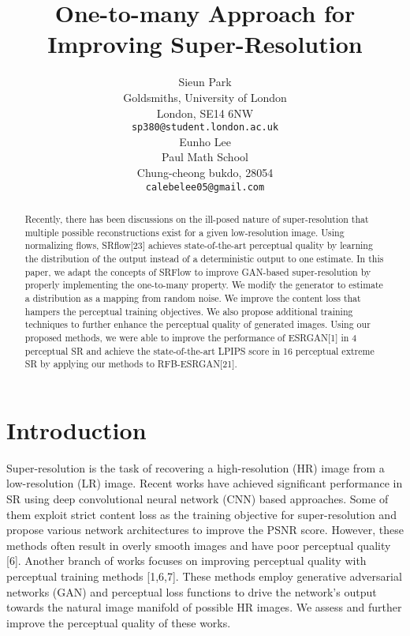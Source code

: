 \documentclass{article}
\title{One-to-many Approach for Improving Super-Resolution}
\author{Sieun Park \\
  Goldsmiths, University of London\\
  London, SE14 6NW \\
  \texttt{sp380@student.london.ac.uk} \\
\And
   Eunho Lee \\
   Paul Math School \\
   Chung-cheong bukdo, 28054 \\
   \texttt{calebelee05@gmail.com} \\
}
\begin{document}
\maketitle

\begin{abstract}


  Recently, there has been discussions on the ill-posed nature of super-resolution that multiple possible reconstructions exist for a given low-resolution image. Using normalizing flows, SRflow[23] achieves state-of-the-art perceptual quality by learning the distribution of the output instead of a deterministic output to one estimate. In this paper, we adapt the concepts of SRFlow to improve GAN-based super-resolution by properly implementing the one-to-many property. We modify the generator to estimate a distribution as a mapping from random noise. We improve the  content loss that hampers the perceptual training objectives. We also propose additional training techniques to further enhance the perceptual quality of generated images. Using our proposed methods, we were able to improve the performance of ESRGAN[1] in 4 perceptual SR and achieve the state-of-the-art LPIPS score in 16 perceptual extreme SR by applying our methods to RFB-ESRGAN[21].
  
\end{abstract}


\section{Introduction}

Super-resolution is the task of recovering a high-resolution (HR) image from a low-resolution (LR) image. Recent works have achieved significant performance in SR using deep convolutional neural network (CNN) based approaches. Some of them exploit strict content loss as the training objective for super-resolution and propose various network architectures to improve the PSNR score. However, these methods often result in overly smooth images and have poor perceptual quality [6]. Another branch of works focuses on improving perceptual quality with perceptual training methods [1,6,7]. These methods employ generative adversarial networks (GAN) and perceptual loss functions to drive the network's output towards the natural image manifold of possible HR images. We assess and further improve the perceptual quality of these works.
\end{document}

